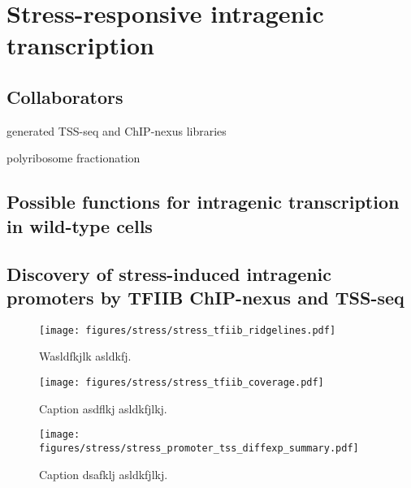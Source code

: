 \chapter{Stress-responsive intragenic transcription}

\section{Collaborators}

\begin{description}[align=right, labelwidth=5cm, noitemsep]
    \item [Steve Doris] generated TSS-seq and ChIP-nexus libraries
    \item [Dan Spatt] polyribosome fractionation
\end{description}

\section{Possible functions for intragenic transcription in wild-type cells}

\section{Discovery of stress-induced intragenic promoters by TFIIB ChIP-nexus and TSS-seq}

\begin{figure}
\texttt{[image: figures/stress/stress\_tfiib\_ridgelines.pdf]}
\caption[TFIIB ChIP-nexus protection over all genes with stress-induced intragenic TFIIB peaks.]{Wasldfkjlk asldkfj.}
\label{fig:stress_tfiib_ridgelines}
\end{figure}

\begin{figure}
\texttt{[image: figures/stress/stress\_tfiib\_coverage.pdf]}
\label{fig:stress_tfiib_coverage}
\caption[TFIIB ChIP-nexus protection over four genes with stress-induced intragenic TFIIB peaks.]{Caption asdflkj asldkfjlkj.}
\end{figure}

\begin{figure}
\texttt{[image: figures/stress/stress\_promoter\_tss\_diffexp\_summary.pdf]}
\caption[Bar plot of the number of promoters from various genomic classes differentially expressed in oxidative stress.]{Caption dsafklj asldkfjlkj.}
\label{fig:stress_promoter_tss_diffexp_summary}
\end{figure}

